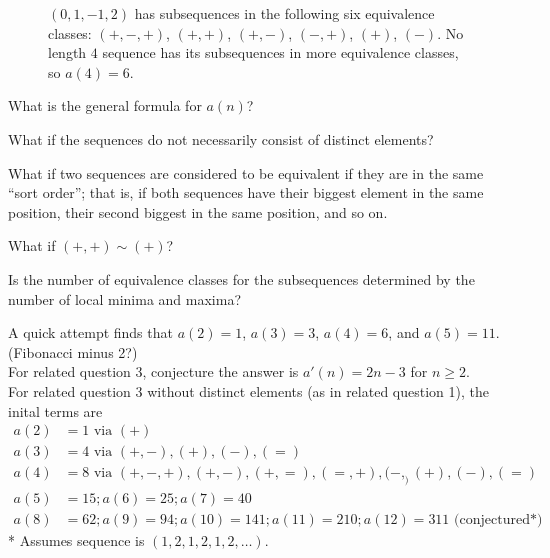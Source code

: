 \documentclass{article}
\begin{document}
\begin{figure}[!h]
\hspace{0.5cm}
  \caption{
    $(0, 1, -1, 2)$ has subsequences in the following six equivalence classes:
    $(+, -, +)$, $(+, +)$, $(+, -)$, $(-, +)$, $(+)$, $(-)$. No length $4$
    sequence has its subsequences in more equivalence classes, so $a(4) = 6$.
  }
\end{figure}

\begin{question}
  What is the general formula for $a(n)$?
\end{question}
\begin{related}
  \item What if the sequences do not necessarily consist of distinct elements?
  \item What if two sequences are considered to be equivalent if they are in the
    same ``sort order''; that is, if both sequences have their biggest element
    in the same position, their second biggest in the same position, and so on.
  \item What if $(+, +) \sim (+)$?
  \item Is the number of equivalence classes for the subsequences determined by
   the number of local minima and maxima?
\end{related}

\begin{note}
  A quick attempt finds that $a(2) = 1$, $a(3) = 3$, $a(4)=6$, and $a(5)=11$.
  (Fibonacci minus 2?)\\
  For related question 3, conjecture the answer is $a'(n) = 2n - 3$ for $n \geq 2$.\\
  For related question 3 without distinct elements (as in related question 1),
  the inital terms are
  \begin{align*}
    a(2) &= 1 \text { via } (+)  \\
    a(3) &= 4 \text { via } (+, -), (+), (-), (=)  \\
    a(4) &= 8 \text { via } (+, -, +), (+, -), (+, =), (=, +), (-, _) (+), (-), (=)  \\
    a(5) &= 15; a(6) = 25; a(7) = 40\\
    a(8) &= 62; a(9) = 94; a(10) = 141; a(11) = 210; a(12) = 311 \text{ (conjectured*)}
  \end{align*}
  * Assumes sequence is $(1,2,1,2,1,2,\hdots)$.
\end{note}
\end{document}

